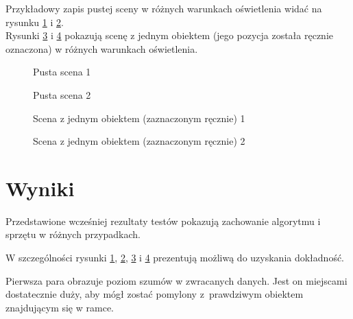 Przykładowy zapis pustej sceny w różnych warunkach oświetlenia widać na rysunku \ref{fig:scene_empty_1} i \ref{fig:scene_empty_2}.\\

Rysunki \ref{fig:scene_with_one_obstacle_1} i \ref{fig:scene_with_one_obstacle_2} pokazują scenę z jednym obiektem (jego pozycja została ręcznie oznaczona) w różnych warunkach oświetlenia.\\

\begin{figure}
 \centering
 \makebox[\textwidth][l]{
  \resizebox{.9\largefigure}{!}{
    \def\svgwidth{0.9\largefigure}
    
  }
 }
 \caption{Pusta scena 1}
 \label{fig:scene_empty_1}
\end{figure}

\begin{figure}
 \centering
 \makebox[\textwidth][l]{
  \resizebox{.9\largefigure}{!}{
    \def\svgwidth{0.9\largefigure}
    
  }
 }
 \caption{Pusta scena 2}
 \label{fig:scene_empty_2}
\end{figure}

\begin{figure}
 \centering
 \makebox[\textwidth][r]{
  \resizebox{.9\largefigure}{!}{
    \def\svgwidth{0.9\largefigure}
    
  }
 }
 \caption{Scena z jednym obiektem (zaznaczonym ręcznie) 1}
 \label{fig:scene_with_one_obstacle_1}
\end{figure}

\begin{figure}
 \centering
 \makebox[\textwidth][r]{
  \resizebox{.9\largefigure}{!}{
    \def\svgwidth{0.9\largefigure}
    
  }
 }
 \caption{Scena z jednym obiektem (zaznaczonym ręcznie) 2}
 \label{fig:scene_with_one_obstacle_2}
\end{figure}

\section{Wyniki}

Przedstawione wcześniej rezultaty testów pokazują zachowanie algorytmu i sprzętu w różnych przypadkach.

W szczególności rysunki \ref{fig:scene_empty_1}, \ref{fig:scene_empty_2}, \ref{fig:scene_with_one_obstacle_1} i \ref{fig:scene_with_one_obstacle_2} prezentują możliwą do uzyskania dokładność.

Pierwsza para obrazuje poziom szumów w zwracanych danych.
Jest on miejscami dostatecznie duży, aby mógł zostać pomylony z~prawdziwym obiektem znajdującym się w ramce.\\

